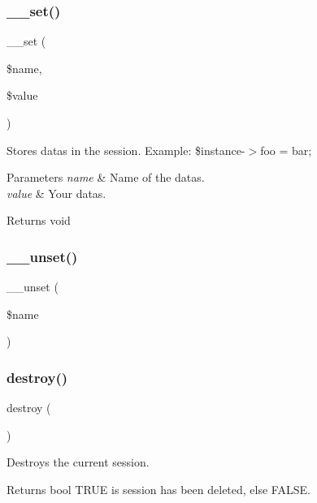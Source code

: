 \subsubsection{\texorpdfstring{\+\_\+\+\_\+set()}{\_\_set()}}
{\footnotesize\ttfamily \+\_\+\+\_\+set (\begin{DoxyParamCaption}\item[{}]{\$name,  }\item[{}]{\$value }\end{DoxyParamCaption})}

Stores datas in the session. Example\+: \$instance-\/$>$foo = \textquotesingle{}bar\textquotesingle{};


\begin{DoxyParams}{Parameters}
{\em name} & Name of the datas. \\
\hline
{\em value} & Your datas. \\
\hline
\end{DoxyParams}
\begin{DoxyReturn}{Returns}
void 
\end{DoxyReturn}
\mbox{\label{class_session_a1a50a7a2fced40bf8afc1d437cbb8907}} 
\subsubsection{\texorpdfstring{\+\_\+\+\_\+unset()}{\_\_unset()}}
{\footnotesize\ttfamily \+\_\+\+\_\+unset (\begin{DoxyParamCaption}\item[{}]{\$name }\end{DoxyParamCaption})}

\mbox{\label{class_session_aa118461de946085fe42989193337044a}} 
\subsubsection{\texorpdfstring{destroy()}{destroy()}}
{\footnotesize\ttfamily destroy (\begin{DoxyParamCaption}{ }\end{DoxyParamCaption})}

Destroys the current session.

\begin{DoxyReturn}{Returns}
bool T\+R\+UE is session has been deleted, else F\+A\+L\+SE. 
\end{DoxyReturn}
\mbox{\label{class_session_ac93fbec81f07e5d15f80db907e63dc10}} 
